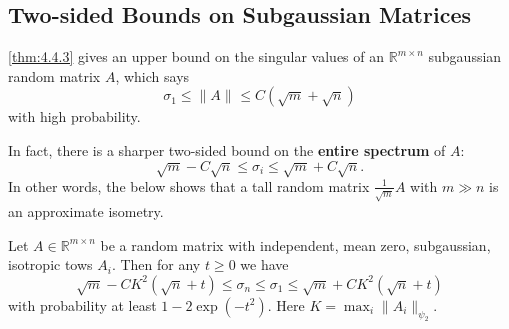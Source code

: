 \subsection{Two-sided Bounds on Subgaussian Matrices}
\cref{thm:4.4.3} gives an upper bound on the singular values of an $\mathbb{R}^{m \times n}$ subgaussian 
random matrix $A$, which says 
\[ \sigma_1 \leq \lVert A \rVert_{} \leq C (\sqrt{m} + \sqrt{n}) \]
with high probability. 

In fact, there is a sharper two-sided bound on the \textbf{entire spectrum} of $A$:
\[ \sqrt{m} - C \sqrt{n} \leq \sigma_i \leq \sqrt{m} + C \sqrt{n}. \]
In other words, the below shows that a tall random matrix $\frac{1}{\sqrt{m}}A$ with $m \gg n$ is an 
approximate isometry.

\begin{theorem}[Name]
\label{thm:4.6.1}
Let $A \in \mathbb{R}^{m \times n}$ be a random matrix with independent, mean zero, subgaussian, isotropic 
tows $A_i$. Then for any $t \geq 0$ we have 
\[ \sqrt{m} - CK^2 (\sqrt{n} + t) \leq \sigma_n \leq \sigma_1 \leq \sqrt{m} + CK^2 (\sqrt{n} + t) \]
with probability at least $1 - 2 \exp{(-t^2)}$. Here $K = \max_{i} \lVert A_i \rVert_{\psi_2}$.
\end{theorem}

